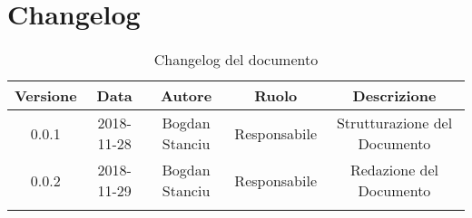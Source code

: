 \newpage

\section{Changelog}

\begin{center}
\begin{longtable}{|c|c|c|c|c|}
\hline
\textbf{Versione} & \textbf{Data} & \textbf{Autore} & \textbf{Ruolo} & \textbf{Descrizione} \\
\hline \hline
\endfirsthead
0.0.1 & 2018-11-28 & Bogdan Stanciu & Responsabile & Strutturazione del Documento \\
0.0.2 & 2018-11-29 & Bogdan Stanciu & Responsabile & Redazione del Documento \\
\hline
\caption{Changelog del documento}
\end{longtable}
\end{center}
